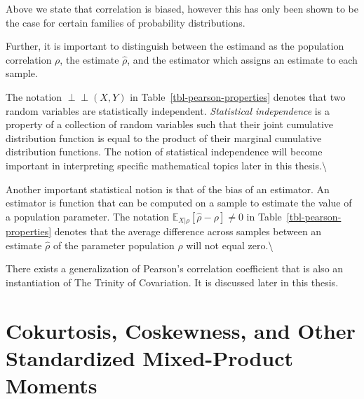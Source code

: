 \documentclass[
  letterpaper,
  DIV=11,
  numbers=noendperiod]{scrreprt}
\begin{document}
\begin{tcolorbox}[enhanced jigsaw, colbacktitle=quarto-callout-caution-color!10!white, bottomrule=.15mm, left=2mm, arc=.35mm, bottomtitle=1mm, coltitle=black, breakable, rightrule=.15mm, toptitle=1mm, opacityback=0, titlerule=0mm, title=\textcolor{quarto-callout-caution-color}{\faFire}\hspace{0.5em}{Some Clarifications About Bias}, colframe=quarto-callout-caution-color-frame, toprule=.15mm, leftrule=.75mm, opacitybacktitle=0.6, colback=white]

Above we state that correlation is biased, however this has only been
shown to be the case for certain families of probability distributions.

Further, it is important to distinguish between the estimand as the
population correlation \(\rho\), the estimate \(\hat \rho\), and the
estimator which assigns an estimate to each sample.

\end{tcolorbox}

The notation \(\perp\!\!\!\!\perp (X, Y)\) in
Table~\ref{tbl-pearson-properties} denotes that two random variables are
statistically independent. \emph{Statistical independence} is a property
of a collection of random variables such that their joint cumulative
distribution function is equal to the product of their marginal
cumulative distribution functions. The notion of statistical
independence will become important in interpreting specific mathematical
topics later in this thesis.\textbackslash{}

Another important statistical notion is that of the bias of an
estimator. An estimator is function that can be computed on a sample to
estimate the value of a population parameter. The notation
\(\mathbb{E}_{X|\rho}[\hat{\rho} - \rho] \neq 0\) in
Table~\ref{tbl-pearson-properties} denotes that the average difference
across samples between an estimate \(\hat{\rho}\) of the parameter
population \(\rho\) will not equal zero.\textbackslash{}

There exists a generalization of Pearson's correlation coefficient that
is also an instantiation of The Trinity of Covariation. It is discussed
later in this thesis.

\section{Cokurtosis, Coskewness, and Other Standardized Mixed-Product
Moments}\label{cokurtosis-coskewness-and-other-standardized-mixed-product-moments}
\end{document}
